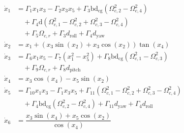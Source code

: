 \documentclass[3p]{elsarticle}
\begin{document}
\begin{align}
    \dot{x}_1 &= \Gamma_1 x_1 x_3 - \Gamma_2 x_3 x_5 + \Gamma_3  \mathrm{b}\mathrm{d}_{\text{cg}}(\Omega_{c, 2}^2 - \Omega_{c, 4}^2) \nonumber \\
    &\quad + \Gamma_4 \mathrm{d} (\Omega_{c, 1}^2 - \Omega_{c, 2}^2 + \Omega_{c, 3}^2 - \Omega_{c, 4}^2) \nonumber \\
    &\quad + \Gamma_5 \Omega_{c, r} + \Gamma_3 d_{\text{roll}} + \Gamma_4 d_{\text{yaw}}  \label{eq:eq_of_motion_start1} \\
    \dot{x}_2 &= x_1 + (x_3\sin(x_2) + x_3\cos(x_2))\tan(x_4) \nonumber \\
    \dot{x}_3 &= \Gamma_6 x_1 x_5 - \Gamma_7 (x_1^2 - x_5^2) + \Gamma_8  \mathrm{b}\mathrm{d}_{\text{cg}}(\Omega_{c, 1}^2 - \Omega_{c, 3}^2) \nonumber \\
    &\quad + \Gamma_9 \Omega_{c, r} + \Gamma_8 d_{\text{pitch}} \\
    \dot{x}_4 &= x_3\cos(x_4) - x_5\sin(x_2) \\
    \dot{x}_5 &= \Gamma_{10} x_1 x_3 - \Gamma_{1} x_3 x_5 + \Gamma_{11} (\Omega_{c, 1}^2 - \Omega_{c, 2}^2 + \Omega_{c, 3}^2 - \Omega_{c, 4}^2) \nonumber \\
    &\quad + \Gamma_{4}  \mathrm{b}\mathrm{d}_{\text{cg}} (\Omega_{c, 2}^2 - \Omega_{c, 4}^2) + \Gamma_{11} d_{\text{yaw}} + \Gamma_{4} d_{\text{roll}} \\
    \dot{x}_6 &= \dfrac{x_3\sin(x_4) + x_5\cos(x_2)}{\cos(x_4)}~\label{eq:eq_of_motion_end1}
\end{align}
\end{document}
